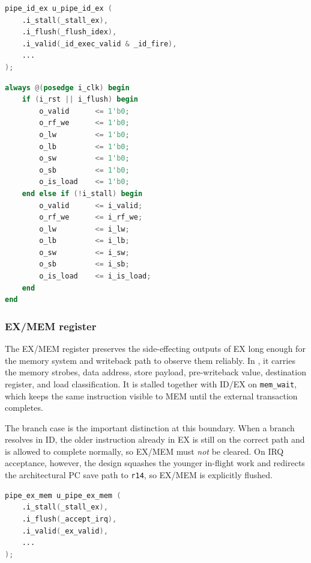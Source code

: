 \documentclass[11pt,a4paper]{article}
\begin{document}
\begin{lstlisting}[language=Verilog,caption={ID/EX control wiring in \texttt{srcs/m\_cpu.v}}]
pipe_id_ex u_pipe_id_ex (
    .i_stall(_stall_ex),
    .i_flush(_flush_idex),
    .i_valid(_id_exec_valid & _id_fire),
    ...
);
\end{lstlisting}

\begin{lstlisting}[language=Verilog,caption={ID/EX storage behavior in \texttt{srcs/m\_pipe\_id\_ex.v}}]
always @(posedge i_clk) begin
    if (i_rst || i_flush) begin
        o_valid      <= 1'b0;
        o_rf_we      <= 1'b0;
        o_lw         <= 1'b0;
        o_lb         <= 1'b0;
        o_sw         <= 1'b0;
        o_sb         <= 1'b0;
        o_is_load    <= 1'b0;
    end else if (!i_stall) begin
        o_valid      <= i_valid;
        o_rf_we      <= i_rf_we;
        o_lw         <= i_lw;
        o_lb         <= i_lb;
        o_sw         <= i_sw;
        o_sb         <= i_sb;
        o_is_load    <= i_is_load;
    end
end
\end{lstlisting}

\subsubsection{EX/MEM register}

The EX/MEM register preserves the side-effecting outputs of EX long enough for the memory system and writeback path to observe them reliably. In , it carries the memory strobes, data address, store payload, pre-writeback value, destination register, and load classification. It is stalled together with ID/EX on \texttt{mem\_wait}, which keeps the same instruction visible to MEM until the external transaction completes.

The branch case is the important distinction at this boundary. When a branch resolves in ID, the older instruction already in EX is still on the correct path and is allowed to complete normally, so EX/MEM must \emph{not} be cleared. On IRQ acceptance, however, the design squashes the younger in-flight work and redirects the architectural PC save path to \texttt{r14}, so EX/MEM is explicitly flushed.

\begin{lstlisting}[language=Verilog,caption={EX/MEM control wiring in \texttt{srcs/m\_cpu.v}}]
pipe_ex_mem u_pipe_ex_mem (
    .i_stall(_stall_ex),
    .i_flush(_accept_irq),
    .i_valid(_ex_valid),
    ...
);
\end{lstlisting}
\end{document}
